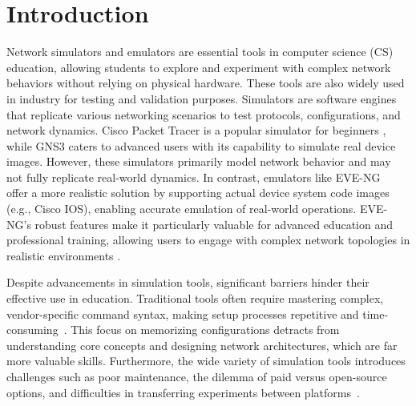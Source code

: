 \section{Introduction}

Network simulators and emulators are essential tools in computer science (CS) education, allowing students to explore and experiment with complex network behaviors without relying on physical hardware. These tools are also widely used in industry for testing and validation purposes. Simulators are software engines that replicate various networking scenarios to test protocols, configurations, and network dynamics. Cisco Packet Tracer \cite{janitor2010visual} is a popular simulator for beginners \cite{allison2022simulation}, while GNS3 \cite{neumann2015book} caters to advanced users with its capability to simulate real device images. However, these simulators primarily model network behavior and may not fully replicate real-world dynamics.
In contrast, emulators like EVE-NG~\cite{EVE-NG} offer a more realistic solution by supporting actual device system code images (e.g., Cisco IOS), enabling accurate emulation of real-world operations. EVE-NG’s robust features make it particularly valuable for advanced education and professional training, allowing users to engage with complex network topologies in realistic environments \cite{sharma2024comparison}.


\vspace{1mm} Despite advancements in simulation tools, significant barriers hinder their effective use in education. Traditional tools often require mastering complex, vendor-specific command syntax, making setup processes repetitive and time-consuming~\cite{sierszen2017teaching}. This focus on memorizing configurations detracts from understanding core concepts and designing network architectures, which are far more valuable skills. Furthermore, the wide variety of simulation tools introduces challenges such as poor maintenance, the dilemma of paid versus open-source options, and difficulties in transferring experiments between platforms~\cite{marquardson2019simulation}.

